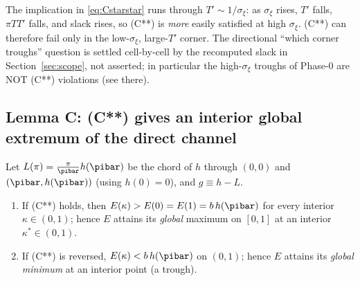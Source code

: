 \begin{remark}[Orientation of (C**)]
\label{rem:orientation}
The implication in \eqref{eq:Cstarstar} runs through $T'\sim1/\sigma_\xi$: as
$\sigma_\xi$ rises, $T'$ falls, $\pi T T'$ falls, and slack rises, so (C**) is
\emph{more} easily satisfied at high $\sigma_\xi$. (C**) can therefore fail only
in the low-$\sigma_\xi$, large-$T'$ corner. The directional ``which corner
troughs'' question is settled cell-by-cell by the recomputed slack in
Section~\ref{sec:scope}, not asserted; in particular the high-$\sigma_\xi$
troughs of Phase-0 are NOT (C**) violations (see there).
\end{remark}

\subsection*{Lemma C: (C**) gives an interior global extremum of the direct channel}

\begin{lemma}
\label{lem:LemmaC}
Let $L(\pi)=\frac{\pi}{\pibar}h(\pibar)$ be the chord of $h$ through $(0,0)$
and $(\pibar,h(\pibar))$ (using $h(0)=0$), and $g\equiv h-L$.
\begin{enumerate}
\item[(a)] If \textup{(C**)} holds, then $E(\kappa)>E(0)=E(1)=b\,h(\pibar)$ for
every interior $\kappa\in(0,1)$; hence $E$ attains its \emph{global} maximum on
$[0,1]$ at an interior $\kappa^\ast\in(0,1)$.
\item[(b)] If \textup{(C**) is reversed}, $E(\kappa)<b\,h(\pibar)$ on $(0,1)$;
hence $E$ attains its \emph{global minimum} at an interior point (a trough).
\end{enumerate}
\end{lemma}

